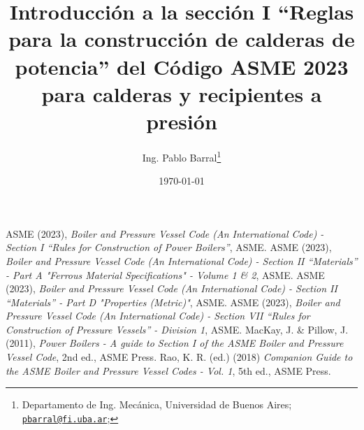 \documentclass[10pt,a4paper]{article}
\title{Introducción a la sección I ``Reglas para la construcción de calderas de potencia'' del Código ASME 2023 para calderas y recipientes a presión}
\author{Ing. Pablo Barral\thanks{Departamento de Ing. Mecánica, Universidad de Buenos Aires; 
     \href{mailto:pbarral@fi.uba.ar}{\texttt{pbarral@fi.uba.ar}};
     \raisebox{0.25ex}{\href{https://www.linkedin.com/in/pablo-barral}{\texttt{[image: linkedin\_logo.png]}}}}
     }
\affil{Sistemas de Almacenamiento}
\date{\today}
\begin{document}
     
     
     
     
     
     
     \newpage
     \tableofcontents
     \newpage
     \begin{thebibliography}{9}
          ASME (2023), \emph{Boiler and Pressure Vessel Code (An International Code) - Section I ``Rules for Construction of Power Boilers''}, ASME.
          ASME (2023), \emph{Boiler and Pressure Vessel Code (An International Code) - Section II ``Materials'' - Part A "Ferrous Material Specifications" - Volume 1 \& 2}, ASME.
          ASME (2023), \emph{Boiler and Pressure Vessel Code (An International Code) - Section II ``Materials'' - Part D "Properties (Metric)"}, ASME.
          ASME (2023), \emph{Boiler and Pressure Vessel Code (An International Code) - Section VII ``Rules for Construction of Pressure Vessels'' - Division 1}, ASME.
          MacKay, J. \& Pillow, J. (2011), \emph{Power Boilers - A guide to Section I of the ASME Boiler and Pressure Vessel Code}, 2nd ed., ASME Press.
          Rao, K. R. (ed.) (2018) \emph{Companion Guide to the ASME Boiler and Pressure Vessel Codes - Vol. 1}, 5th ed., ASME Press.     
     \end{thebibliography}
\end{document}

